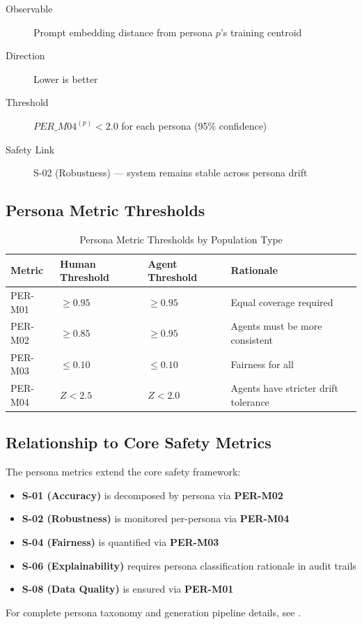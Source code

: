 \begin{description}
  \item[Observable] Prompt embedding distance from persona $p$'s training centroid
  \item[Direction] Lower is better
  \item[Threshold] $PER\_M04^{(p)} < 2.0$ for each persona (95\% confidence)
  \item[Safety Link] S-02 (Robustness) --- system remains stable across persona drift
\end{description}

\subsection{Persona Metric Thresholds}

\begin{table}[htbp]
\centering
\caption{Persona Metric Thresholds by Population Type}
\label{tab:persona-thresholds}
\begin{tabular}{l l l l}
\toprule
\textbf{Metric} & \textbf{Human Threshold} & \textbf{Agent Threshold} & \textbf{Rationale} \\
\midrule
PER-M01 & $\geq 0.95$ & $\geq 0.95$ & Equal coverage required \\
PER-M02 & $\geq 0.85$ & $\geq 0.95$ & Agents must be more consistent \\
PER-M03 & $\leq 0.10$ & $\leq 0.10$ & Fairness for all \\
PER-M04 & $Z < 2.5$ & $Z < 2.0$ & Agents have stricter drift tolerance \\
\bottomrule
\end{tabular}
\end{table}

\subsection{Relationship to Core Safety Metrics}

The persona metrics extend the core safety framework:

\begin{itemize}
  \item \textbf{S-01 (Accuracy)} is decomposed by persona via \textbf{PER-M02}
  \item \textbf{S-02 (Robustness)} is monitored per-persona via \textbf{PER-M04}
  \item \textbf{S-04 (Fairness)} is quantified via \textbf{PER-M03}
  \item \textbf{S-06 (Explainability)} requires persona classification rationale in audit trails
  \item \textbf{S-08 (Data Quality)} is ensured via \textbf{PER-M01}
\end{itemize}

For complete persona taxonomy and generation pipeline details,
see .
